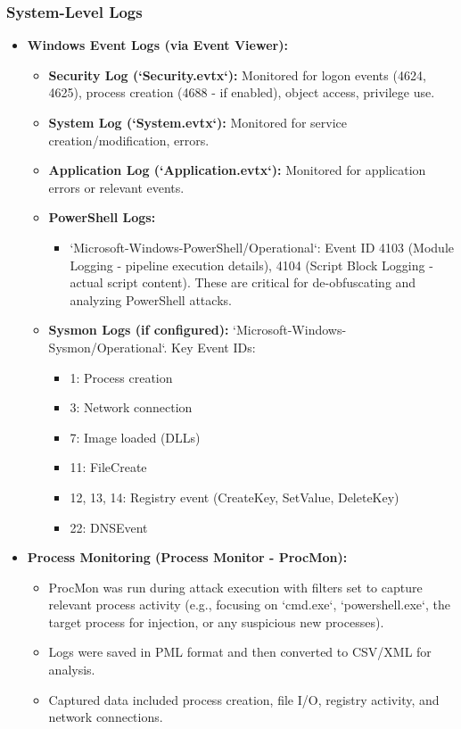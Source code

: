\documentclass[11pt]{article}
\begin{document}
	\subsubsection{System-Level Logs}
	\begin{itemize}
		\item \textbf{Windows Event Logs (via Event Viewer):}
		\begin{itemize}
			\item \textbf{Security Log (`Security.evtx`):} Monitored for logon events (4624, 4625), process creation (4688 - if enabled), object access, privilege use.
			\item \textbf{System Log (`System.evtx`):} Monitored for service creation/modification, errors.
			\item \textbf{Application Log (`Application.evtx`):} Monitored for application errors or relevant events.
			\item \textbf{PowerShell Logs:}
			\begin{itemize}
				\item `Microsoft-Windows-PowerShell/Operational`: Event ID 4103 (Module Logging - pipeline execution details), 4104 (Script Block Logging - actual script content). These are critical for de-obfuscating and analyzing PowerShell attacks.
			\end{itemize}
			\item \textbf{Sysmon Logs (if configured):} `Microsoft-Windows-Sysmon/Operational`. Key Event IDs:
			\begin{itemize}
				\item 1: Process creation
				\item 3: Network connection
				\item 7: Image loaded (DLLs)
				\item 11: FileCreate
				\item 12, 13, 14: Registry event (CreateKey, SetValue, DeleteKey)
				\item 22: DNSEvent
			\end{itemize}
		\end{itemize}
		\item \textbf{Process Monitoring (Process Monitor - ProcMon):}
		\begin{itemize}
			\item ProcMon was run during attack execution with filters set to capture relevant process activity (e.g., focusing on `cmd.exe`, `powershell.exe`, the target process for injection, or any suspicious new processes).
			\item Logs were saved in PML format and then converted to CSV/XML for analysis.
			\item Captured data included process creation, file I/O, registry activity, and network connections.
		\end{itemize}
	\end{itemize}
	
\end{document}
